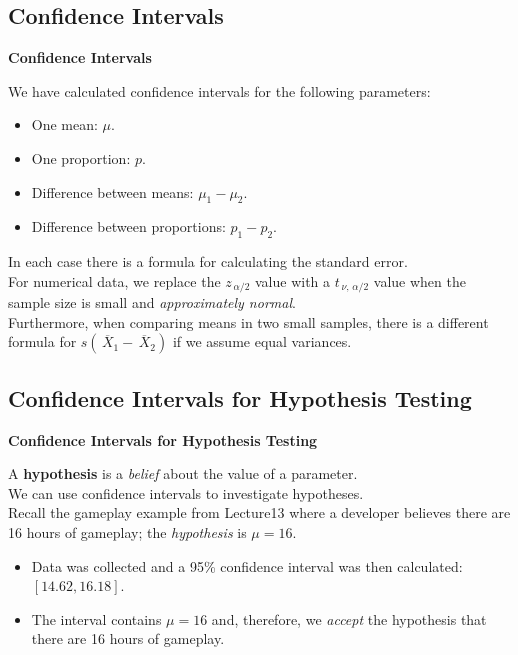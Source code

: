 \documentclass[compress]{beamer}        %
\makeatletter
\newcommand{\tcb}{\textcolor{beamer@blendedblue}}
\makeatother
\begin{document}
\subsection{Confidence Intervals}
\begin{frame}{\bf \tcb{Confidence Intervals}}

We have calculated confidence intervals for the following parameters:\\[0.1cm]
\begin{itemize}\itemsep0.3cm
\item One mean: $\mu$.
\item One proportion: $p$.
\item Difference between means: $\mu_1 - \mu_2$.
\item Difference between proportions: $p_1 - p_2$.\\[0.3cm]
\end{itemize}

In each case there is a formula for calculating the standard error.\\[0.4cm]

For numerical data, we replace the $z_{\,\alpha/2}$ value with a $t_{\,\nu,\,\alpha/2}$ value when the sample size is small and \emph{approximately normal}.\\[0.4cm]

Furthermore, when comparing means in two small samples, there is a different formula for $s(\,\overline{\!X}_1-\,\overline{\!X}_2)$ if we assume equal variances.


\end{frame}









\subsection{Confidence Intervals for Hypothesis Testing}
\begin{frame}{\bf \tcb{Confidence Intervals for Hypothesis Testing}}

A {\bf hypothesis} is a \emph{belief} about the value of a parameter.\\[0.9cm]

We can use confidence intervals to investigate hypotheses.\\[0.9cm]

Recall the gameplay example from Lecture13 where a developer believes there are 16 hours of gameplay; the \emph{hypothesis} is $\mu = 16$.\\[0.1cm]
\begin{itemize}\itemsep0.4cm
\item Data was collected and a 95\% confidence interval was then calculated: $[14.62, 16.18]$.
\item The interval contains $\mu=16$ and, therefore, we \emph{accept} the hypothesis that there are 16 hours of gameplay.
\end{itemize}
\end{frame}
\end{document}
